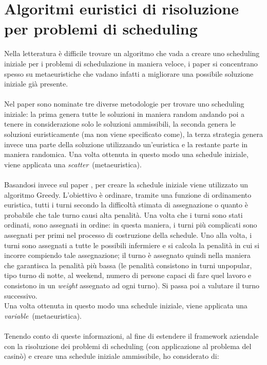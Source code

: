\section{Algoritmi euristici di risoluzione per problemi di scheduling}
Nella letteratura è difficile trovare un algoritmo che vada a creare uno scheduling iniziale per i problemi di schedulazione in maniera veloce, i paper si concentrano spesso su metaeuristiche che vadano infatti a migliorare una possibile soluzione iniziale già presente. \\
\\
Nel paper  sono nominate tre diverse metodologie per trovare uno scheduling iniziale: la prima genera tutte le soluzioni in maniera random andando poi a tenere in considerazione solo le soluzioni ammissibili, la seconda genera le soluzioni euristicamente (ma non viene specificato come), la terza strategia genera invece una parte della soluzione utilizzando un’euristica e la restante parte in maniera randomica. Una volta ottenuta in questo modo una schedule iniziale, viene applicata una \emph{\gls{scatter}}\glsfirstoccur\ (metaeuristica).\\
\\
Basandosi invece sul paper , per creare la schedule iniziale viene utilizzato un algoritmo Greedy.
L’obiettivo è ordinare, tramite una funzione di ordinamento euristica, tutti i turni secondo la difficoltà stimata di assegnazione o quanto è probabile che tale turno causi alta penalità. 
Una volta che i turni sono stati ordinati, sono assegnati in ordine: in questa maniera, i turni più complicati sono assegnati per primi nel processo di costruzione della schedule. Uno alla volta, i turni sono assegnati a tutte le possibili infermiere e si calcola la penalità in cui si incorre compiendo tale assegnazione; il turno è assegnato quindi nella maniera che garantisca la penalità più bassa (le penalità consistono in turni unpopular, tipo turno di notte, al weekend, numero di persone capaci di fare quel lavoro e consistono in un \textit{weight} assegnato ad ogni turno). Si passa poi a valutare il turno successivo.\\
Una volta ottenuta in questo modo una schedule iniziale, viene applicata una \emph{\gls{variable}}\glsfirstoccur\ (metaeuristica).
\\ \\
Tenendo conto di queste informazioni, al fine di estendere il framework aziendale con la risoluzione dei problemi di scheduling (con applicazione al problema del casinò) e creare una schedule iniziale ammissibile, ho considerato di:
